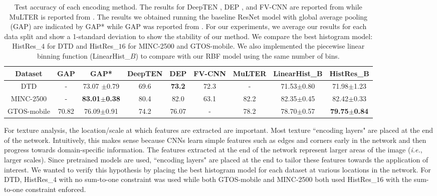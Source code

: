 \documentclass[journal]{IEEEtai}
\begin{document}
	\begin{table*}
		\centering
		\caption{Test accuracy of each encoding method. The results for DeepTEN \cite{zhang2017deep}, DEP \cite{xue2018deep}, and FV-CNN \cite{cimpoi2015deep} are reported from \cite{xue2018deep} while MuLTER is reported from \cite{hu2019multi}. The results we obtained running the baseline ResNet model with global average pooling (GAP) are indicated by GAP* while GAP was reported from \cite{xue2018deep}. For our experiments, we average our results for each data split and show a 1-standard deviation to show the stability of our method. We compare the best histogram model: HistRes\_$4$ for DTD and HistRes\_$16$ for MINC-2500 and GTOS-mobile. We also implemented the piecewise linear binning function \cite{wang2016learnable}
		(LinearHist\_$B$) to compare with our RBF model using the same number of bins.}
        \begin{tabular}{|c|c|c|c|c|c|c|c|c|}
            \hline
            Dataset     & GAP   & GAP*                    & DeepTEN & DEP           & FV-CNN & MuLTER & LinearHist\_B  & HistRes\_B              \\ \hline
            DTD         & -     & 73.07 $\pm$0.79         & 69.6    & \textbf{73.2} & 72.3   & -      & 71.53$\pm$0.80 & 71.98$\pm$1.23          \\ \hline
            MINC-2500   & -     & \textbf{83.01$\pm$0.38} & 80.4    & 82.0          & 63.1   & 82.2   & 82.35$\pm$0.45 & 82.42$\pm$0.33          \\ \hline
            GTOS-mobile & 70.82 & 76.09$\pm$0.91          & 74.2    & 76.07         & -      & 78.2   & 78.70$\pm$0.57 & \textbf{79.75$\pm$0.84} \\ \hline
        \end{tabular}
		\label{tab:test_acc}

	\end{table*}	
	For texture analysis, the location/scale at which features are extracted are important. Most texture ``encoding layers" are placed at the end of the network. Intuitively, this makes sense because CNNs learn simple features such as edges and corners early in the network and then progress towards domain-specific information. The features extracted at the end of the network represent larger areas of the image (\textit{i.e.}, larger scales). Since pretrained models are used, ``encoding layers" are placed at the end to tailor these features towards the application of interest. We wanted to verify this hypothesis by placing the best histogram model for each dataset at various locations in the network. For DTD, HistRes\_$4$ with no sum-to-one constraint was used while both GTOS-mobile and MINC-2500 both used HistRes\_$16$ with the sum-to-one constraint enforced. 
	
\end{document}
